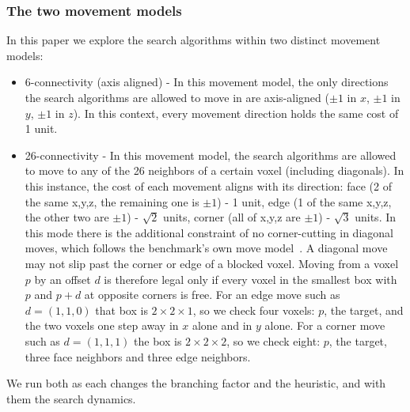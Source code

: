 \documentclass[letterpaper]{article} %
\begin{document}
\subsubsection{The two movement models}
In this paper we explore the search algorithms within two distinct movement models:
\begin{itemize}
  \item 6-connectivity (axis aligned) - In this movement model, the only directions the search algorithms are allowed to move in are axis-aligned ($\pm1$ in $x$, $\pm1$ in $y$, $\pm1$ in $z$). In this context, every movement direction holds the same cost of 1 unit.
  \item 26-connectivity - In this movement model, the search algorithms are allowed to move to any of the 26 neighbors of a certain voxel (including diagonals). In this instance, the cost of each movement aligns with its direction: face (2 of the same x,y,z, the remaining one is $\pm1$) - 1 unit, edge (1 of the same x,y,z, the other two are $\pm1$) - $\sqrt{2}$ units, corner (all of x,y,z are $\pm1$) - $\sqrt{3}$ units. In this mode there is the additional constraint of no corner-cutting in diagonal moves, which follows the benchmark's own move model~\cite{nobes2023voxel}. A diagonal move may not slip past the corner or edge of a blocked voxel. Moving from a voxel $p$ by an offset $d$ is therefore legal only if every voxel in the smallest box with $p$ and $p+d$ at opposite corners is free. For an edge move such as $d=(1,1,0)$ that box is $2\times2\times1$, so we check four voxels: $p$, the target, and the two voxels one step away in $x$ alone and in $y$ alone. For a corner move such as $d=(1,1,1)$ the box is $2\times2\times2$, so we check eight: $p$, the target, three face neighbors and three edge neighbors.
\end{itemize}
We run both as each changes the branching factor and the heuristic, and with them the search dynamics.
\end{document}
